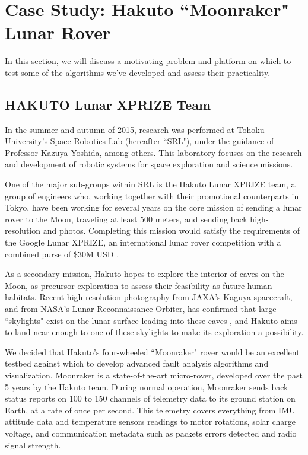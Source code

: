 \chapter{Case Study: Hakuto ``Moonraker" Lunar Rover}

In this section, we will discuss a motivating problem and platform on which to test some of the algorithms we've developed and assess their practicality.

\section{HAKUTO Lunar XPRIZE Team}

In the summer and autumn of 2015, research was performed at Tohoku University's Space Robotics Lab (hereafter ``SRL"), under the guidance of Professor Kazuya Yoshida, among others. This laboratory focuses on the research and development of robotic systems for space exploration and science missions.

One of the major sub-groups within SRL is the Hakuto Lunar XPRIZE team, a group of engineers who, working together with their promotional counterparts in Tokyo, have been working for several years on the core mission of sending a lunar rover to the Moon, traveling at least 500 meters, and sending back high-resolution and photos. Completing this mission would satisfy the requirements of the Google Lunar XPRIZE, an international lunar rover competition with a combined purse of \$30M USD \cite{xprize}.

As a secondary mission, Hakuto hopes to explore the interior of caves on the Moon, as precursor exploration to assess their feasibility as future human habitats. Recent high-resolution photography from JAXA's Kaguya spacecraft, and from NASA's Lunar Reconnaissance Orbiter, has confirmed that large ``skylights" exist on the lunar surface leading into these caves \cite{rabbithole}, and Hakuto aims to land near enough to one of these skylights to make its exploration a possibility.

We decided that Hakuto's four-wheeled ``Moonraker" rover would be an excellent testbed against which to develop advanced fault analysis algorithms and visualization. Moonraker is a state-of-the-art micro-rover, developed over the past 5 years by the Hakuto team. During normal operation, Moonraker sends back status reports on 100 to 150 channels of telemetry data to its ground station on Earth, at a rate of once per second. This telemetry covers everything from IMU attitude data and temperature sensors readings to motor rotations, solar charge voltage, and communication metadata such as packets errors detected and radio signal strength.

